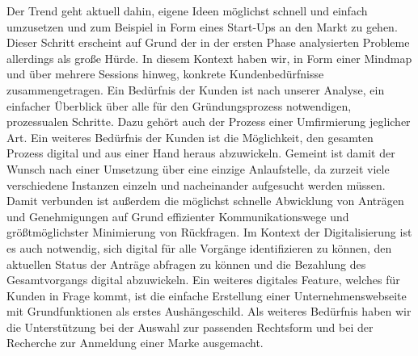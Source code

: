 Der Trend geht aktuell dahin, eigene Ideen möglichst schnell und einfach umzusetzen und zum Beispiel in Form eines Start-Ups an den Markt zu gehen. Dieser Schritt erscheint auf Grund der in der ersten Phase analysierten Probleme allerdings als große Hürde. In diesem Kontext haben wir, in Form einer Mindmap und über mehrere Sessions hinweg, konkrete Kundenbedürfnisse zusammengetragen.
Ein Bedürfnis der Kunden ist nach unserer Analyse, ein einfacher Überblick über alle für den Gründungsprozess notwendigen, prozessualen Schritte. Dazu gehört auch der Prozess einer Umfirmierung jeglicher Art. 
Ein weiteres Bedürfnis der Kunden ist die Möglichkeit, den gesamten Prozess digital und aus einer Hand heraus abzuwickeln. Gemeint ist damit der Wunsch nach einer Umsetzung über eine einzige Anlaufstelle, da zurzeit viele verschiedene Instanzen einzeln und nacheinander aufgesucht werden müssen. Damit verbunden ist außerdem die möglichst schnelle Abwicklung von Anträgen und Genehmigungen auf Grund effizienter Kommunikationswege und größtmöglichster Minimierung von Rückfragen.
Im Kontext der Digitalisierung ist es auch notwendig, sich digital für alle Vorgänge identifizieren zu können, den aktuellen Status der Anträge abfragen zu können und die Bezahlung des Gesamtvorgangs digital abzuwickeln. Ein weiteres digitales Feature, welches für Kunden in Frage kommt, ist die einfache Erstellung einer Unternehmenswebseite mit Grundfunktionen als erstes Aushängeschild.
Als weiteres Bedürfnis haben wir die Unterstützung bei der Auswahl zur passenden Rechtsform und bei der Recherche zur Anmeldung einer Marke ausgemacht.
